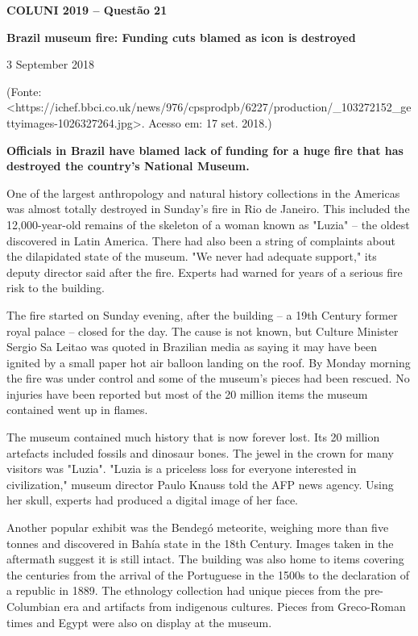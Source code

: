 \textbf{COLUNI 2019 -- Questão 21}\par\medskip \begin{center}\textbf{Brazil museum fire: Funding cuts blamed as icon is destroyed}\end{center}
\begin{flushright}3 September 2018\end{flushright}
\begin{center}(Fonte: <https://ichef.bbci.co.uk/news/976/cpsprodpb/6227/production/_103272152_gettyimages-1026327264.jpg>. Acesso em: 17 set. 2018.)\end{center}

\textbf{Officials in Brazil have blamed lack of funding for a huge fire that has destroyed the country's National Museum.}

One of the largest anthropology and natural history collections in the Americas was almost totally destroyed in Sunday's fire in Rio de Janeiro. This included the 12,000-year-old remains of the skeleton of a woman known as "Luzia" -- the oldest discovered in Latin America. There had also been a string of complaints about the dilapidated state of the museum. "We never had adequate support," its deputy director said after the fire. Experts had warned for years of a serious fire risk to the building.

The fire started on Sunday evening, after the building -- a 19th Century former royal palace -- closed for the day. The cause is not known, but Culture Minister Sergio Sa Leitao was quoted in Brazilian media as saying it may have been ignited by a small paper hot air balloon landing on the roof. By Monday morning the fire was under control and some of the museum's pieces had been rescued. No injuries have been reported but most of the 20 million items the museum contained went up in flames.

The museum contained much history that is now forever lost. Its 20 million artefacts included fossils and dinosaur bones. The jewel in the crown for many visitors was "Luzia". "Luzia is a priceless loss for everyone interested in civilization," museum director Paulo Knauss told the AFP news agency. Using her skull, experts had produced a digital image of her face.

Another popular exhibit was the Bendegó meteorite, weighing more than five tonnes and discovered in Bahía state in the 18th Century. Images taken in the aftermath suggest it is still intact. The building was also home to items covering the centuries from the arrival of the Portuguese in the 1500s to the declaration of a republic in 1889. The ethnology collection had unique pieces from the pre-Columbian era and artifacts from indigenous cultures. Pieces from Greco-Roman times and Egypt were also on display at the museum.

